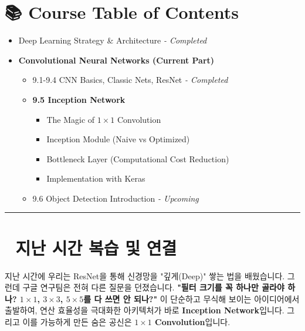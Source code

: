 \documentclass[11pt,a4paper]{book}
\theoremstyle{definition}
\begin{document}
\section*{📚 Course Table of Contents}
\begin{itemize}
    \item[Chapter 1-8.] Deep Learning Strategy \& Architecture \textit{- Completed}
    \item[\textbf{Chapter 9.}] \textbf{Convolutional Neural Networks (Current Part)}
    \begin{itemize}
        \item 9.1-9.4 CNN Basics, Classic Nets, ResNet \textit{- Completed}
        \item \textbf{9.5 Inception Network}
        \begin{itemize}
            \item The Magic of $1 \times 1$ Convolution
            \item Inception Module (Naive vs Optimized)
            \item Bottleneck Layer (Computational Cost Reduction)
            \item Implementation with Keras
        \end{itemize}
        \item 9.6 Object Detection Introduction \textit{- Upcoming}
    \end{itemize}
\end{itemize}

\vspace{0.5cm}
\hrule
\vspace{0.5cm}

\section*{🔗 지난 시간 복습 및 연결}
지난 시간에 우리는 ResNet을 통해 신경망을 "깊게(Deep)" 쌓는 법을 배웠습니다.
그런데 구글 연구팀은 전혀 다른 질문을 던졌습니다.
\textbf{"필터 크기를 꼭 하나만 골라야 하나? $1 \times 1$, $3 \times 3$, $5 \times 5$를 다 쓰면 안 되나?"}
이 단순하고 무식해 보이는 아이디어에서 출발하여, 연산 효율성을 극대화한 아키텍처가 바로 \textbf{Inception Network}입니다. 그리고 이를 가능하게 만든 숨은 공신은 \textbf{$1 \times 1$ Convolution}입니다.

\end{document}
